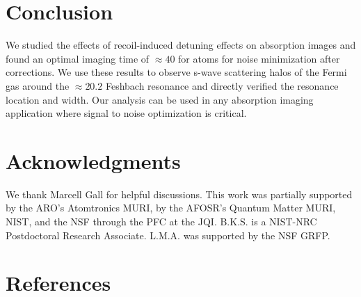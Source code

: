 \documentclass[12pt]{iopart}
\begin{document}
\section{Conclusion}
We studied the effects of recoil-induced detuning effects on absorption images and found an optimal imaging time of $\approx40$ \us{} for \K{} atoms for noise minimization after corrections. We use these results to observe s-wave scattering halos of the Fermi gas around the $\approx 20.2$ \mT{} Feshbach resonance and directly verified the resonance location and width. Our analysis can be used in any absorption imaging application where signal to noise optimization is critical.
\section*{Acknowledgments}
We thank Marcell Gall for helpful discussions. This work was partially supported by the ARO’s Atomtronics MURI, by the
AFOSR’s Quantum Matter MURI, NIST, and the NSF through the PFC at the JQI. B.K.S. is
a NIST-NRC Postdoctoral Research Associate. L.M.A. was supported by the NSF GRFP.

\section*{References}
{}

\end{document}
